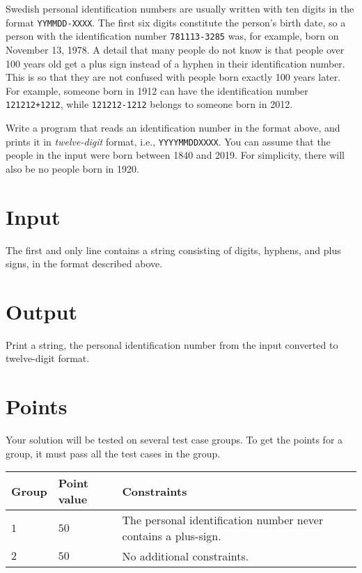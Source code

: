 
Swedish personal identification numbers are usually written with ten digits in the format \texttt{YYMMDD-XXXX}.
The first six digits constitute the person's birth date, so a person with the identification number \texttt{781113-3285}
was, for example, born on November 13, 1978. A detail that many people do not know is that people over 100
years old get a plus sign instead of a hyphen in their identification number. This is so that they are not
confused with people born exactly 100 years later. For example, someone born in 1912 can have the identification number
\texttt{121212+1212}, while \texttt{121212-1212} belongs to someone born in 2012.

Write a program that reads an identification number in the format above,
and prints it in \emph{twelve-digit} format, i.e., \texttt{YYYYMMDDXXXX}.
You can assume that the people in the input were born between 1840 and 2019.
For simplicity, there will also be no people born in 1920.


\section*{Input}
The first and only line contains a string consisting of digits, hyphens, and plus signs, in the format described above.

\section*{Output}
Print a string, the personal identification number from the input converted to twelve-digit format.

\section*{Points}
Your solution will be tested on several test case groups.
To get the points for a group, it must pass all the test cases in the group.

\noindent
\begin{tabular}{| l | l | p{12cm} |}
  \hline
  \textbf{Group} & \textbf{Point value} & \textbf{Constraints} \\ \hline
  $1$    & $50$      & The personal identification number never contains a plus-sign. \\ \hline
  $2$    & $50$      & No additional constraints. \\ \hline
\end{tabular}



